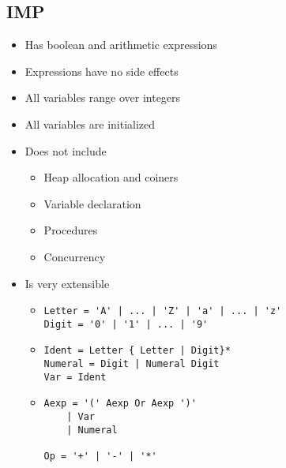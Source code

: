 
\subsection{IMP}
\begin{itemize}
    \item Has boolean and arithmetic expressions
    \item Expressions have no side effects
    \item All variables range over integers
    \item All variables are initialized
    \item Does not include
        \begin{itemize}
            \item Heap allocation and coiners
            \item Variable declaration
            \item Procedures
            \item Concurrency
        \end{itemize}
    \item Is very extensible
        \begin{itemize}
                \begin{itemize}
                    \item
\begin{verbatim}
Letter = 'A' | ... | 'Z' | 'a' | ... | 'z'
Digit = '0' | '1' | ... | '9'
\end{verbatim}

                \end{itemize}
                \begin{itemize}
                    \item
\begin{verbatim}
Ident = Letter { Letter | Digit}*
Numeral = Digit | Numeral Digit
Var = Ident
\end{verbatim}
                \end{itemize}
                \begin{itemize}
                    \item
\begin{verbatim}
Aexp = '(' Aexp Or Aexp ')'
    | Var
    | Numeral

Op = '+' | '-' | '*'
\end{verbatim}


\end{itemize}
\end{itemize}
\end{itemize}
